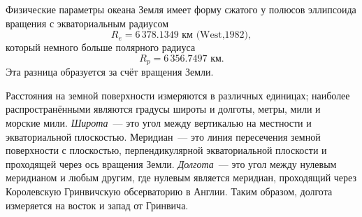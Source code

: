 
\begin{chapter}{Физические параметры океана}\label{chap:3}
Земля имеет форму сжатого у полюсов эллипсоида вращения с экваториальным
радиусом
$$
R_e=6\,378.1349\mbox{~км (West,1982)},
$$ 
который немного больше полярного радиуса 
$$
 R_p=6\,356.7497\mbox{~км}.
$$
Эта разница образуется за
счёт вращения Земли. %
%

Расстояния на земной поверхности измеряются в различных
единицах; наиболее распространёнными являются градусы широты и
долготы, метры, мили и морские мили. \emph{Широта}~--- это угол между
вертикалью на местности и экваториальной плоскостью. Меридиан~--- это
линия пересечения земной поверхности с плоскостью, перпендикулярной 
экваториальной плоскости и проходящей через ось вращения
Земли. \emph{Долгота}~--- это угол между нулевым меридианом и любым другим,
где нулевым является меридиан, проходящий через Королевскую Гринвичскую
обсерваторию в Англии. Таким образом, долгота измеряется на восток и
запад от Гринвича.
%


\end{chapter}
